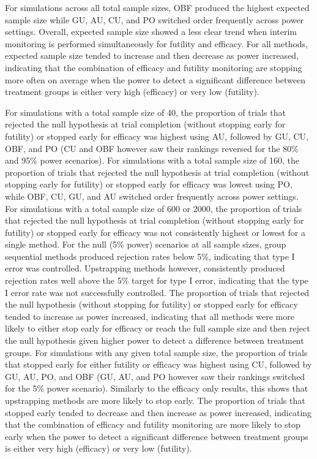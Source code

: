 \documentclass[Afour,sageh,times,square,numbers]{sagej}
\begin{document}
For simulations across all total sample sizes, OBF produced the highest expected sample size while GU, AU, CU, and PO switched order frequently across power settings.  Overall, expected sample size showed a less clear trend when interim monitoring is performed simultaneously for futility and efficacy.  For all methods, expected sample size tended to increase and then decrease as power increased, indicating that the combination of efficacy and futility monitoring are stopping more often on average when the power to detect a significant difference between treatment groups is either very high (efficacy) or very low (futility).  

For simulations with a total sample size of 40, the proportion of trials that rejected the null hypothesis at trial completion (without stopping early for futility) or stopped early for efficacy was highest using AU, followed by GU, CU, OBF, and PO (CU and OBF however saw their rankings reversed for the 80\% and 95\% power scenarios).  For simulations with a total sample size of 160, the proportion of trials that rejected the null hypothesis at trial completion (without stopping early for futility) or stopped early for efficacy was lowest using PO, while OBF, CU, GU, and AU switched order frequently across power settings.  For simulations with a total sample size of 600 or 2000, the proportion of trials that rejected the null hypothesis at trial completion (without stopping early for futility) or stopped early for efficacy was not consistently highest or lowest for a single method.  For the null (5\% power) scenarios at all sample sizes, group sequential methods produced rejection rates below 5\%, indicating that type I error was controlled.  Upstrapping methods however, consistently produced rejection rates well above the 5\% target for type I error, indicating that the type I error rate was not successfully controlled.  The proportion of trials that rejected the null hypothesis (without stopping for futility) or stopped early for efficacy tended to increase as power increased, indicating that all methods were more likely to either stop early for efficacy or reach the full sample size and then reject the null hypothesis given higher power to detect a difference between treatment groups.
For simulations with any given total sample size, the proportion of trials that stopped early for either futility or efficacy was highest using CU, followed by GU, AU, PO, and OBF (GU, AU, and PO however saw their rankings switched for the 5\% power scenario).  Similarly to the efficacy only results, this shows that upstrapping methods are more likely to stop early.  The proportion of trials that stopped early tended to decrease and then increase as power increased, indicating that the combination of efficacy and futility monitoring are more likely to stop early when the power to detect a significant difference between treatment groups is either very high (efficacy) or very low (futility).
\end{document}
